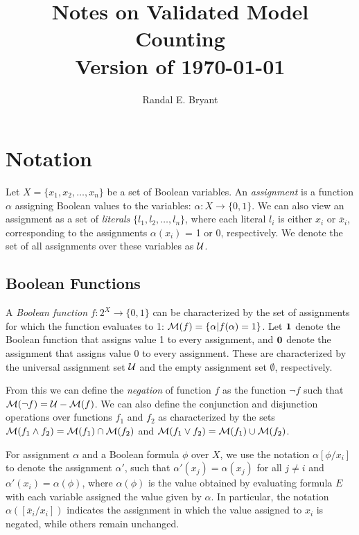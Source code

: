 \documentclass{llncs}
\title{Notes on Validated Model Counting \\ Version of \today}
\author{Randal E. Bryant}
\institute{
Computer Science Department \\
Carnegie Mellon University, Pittsburgh, PA, United States
}
\newcommand{\one}{\mbox{\bf 1}}
\newcommand{\zero}{\mbox{\bf 0}}
\newcommand{\booland}{\land}
\newcommand{\boolor}{\lor}
\newcommand{\boolnot}{\neg}
\newcommand{\tautology}{1}
\newcommand{\nil}{0}
\newcommand{\obar}[1]{\overline{#1}}
\newcommand{\interp}{\alpha}
\newcommand{\uinterp}{{\cal U}}
\newcommand{\interpset}[1]{{\cal M}(#1)}
\newcommand{\subs}[2]{[#2/#1]}
\begin{document}
\maketitle

\section{Notation}

Let $X = \{x_1, x_2, \ldots, x_n\}$ be a set of Boolean variables.  An
{\em assignment} is a function $\interp$ assigning Boolean values to
the variables: $\interp:X \rightarrow \{\nil, \tautology\}$.  We can
also view an assignment as a set of {\em literals} $\{l_1, l_2,
\ldots, l_n\}$, where each literal $l_i$ is either $x_i$ or
$\obar{x}_i$, corresponding to the assignments $\interp(x_i)$ = 1 or 0,
respectively.  We denote the set of all assignments over these variables as $\uinterp$.

\subsection{Boolean Functions}

A {\em Boolean function} $f:2^X \rightarrow \{0,1\}$ can be
characterized by the set of assignments for which the function
evaluates to 1: $\interpset{f} = \{ \interp | f(\interp) = 1\}$.  Let
$\one$ denote the Boolean function that assigns value 1 to every
assignment, and $\zero$ denote the assignment that assigns value 0 to
every assignment.  These are characterized by the universal assignment set $\uinterp$ and the empty
assignment set $\emptyset$, respectively.


From
this we can define the {\em negation} of function $f$ as the function
$\boolnot f$ such that
$\interpset{\boolnot f} = \uinterp - \interpset{f}$.
We can also define the conjunction and disjunction operations over functions $f_1$ and $f_2$ as characterized by the sets
$\interpset{f_1 \booland f_2} = \interpset{f_1} \cap \interpset{f_2}$ and
$\interpset{f_1 \boolor f_2} = \interpset{f_1} \cup \interpset{f_2}$.

For assignment $\interp$ and a Boolean formula $\phi$ over $X$, we
use the notation $\interp\subs{x_i}{\phi}$ to denote the assignment
$\interp'$, such that $\interp'(x_j) = \interp(x_j)$ for all $j \not = i$
and $\interp'(x_i) = \interp(\phi)$, where $\interp(\phi)$ is the value obtained by evaluating formula $E$ with each variable assigned the value given by $\interp$.
In particular, the notation
$\interp(\subs{x_i}{\obar{x}_i})$
indicates the assignment in which the value
assigned to $x_i$ is negated, while others remain unchanged.
\end{document}
